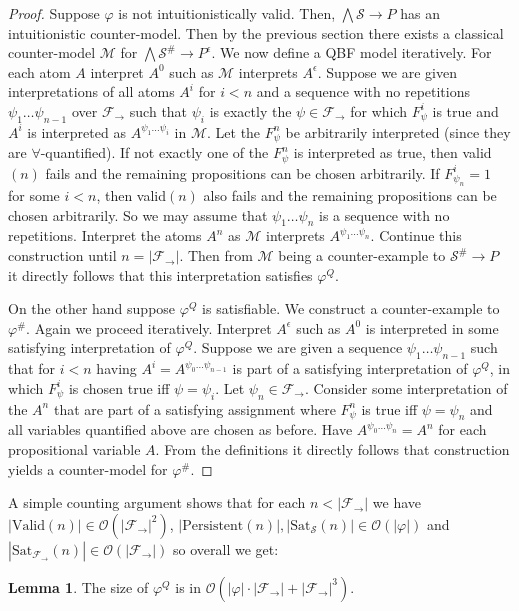 \documentclass[a4paper,11pt]{report}
\theoremstyle{definition}
\theoremstyle{definition}
\theoremstyle{definition}
\newtheorem{lemma}[theorem]{Lemma}
\theoremstyle{definition}
\theoremstyle{definition}
\theoremstyle{definition}
\theoremstyle{definition}
\begin{document}
	\begin{proof}
		Suppose $\varphi$ is not intuitionistically valid.
		Then, $\bigwedge\mathcal S\to P$ has an intuitionistic counter-model. Then by the previous section there exists a classical counter-model $\mathcal M$ for $\bigwedge\mathcal S^\#\to P^\epsilon$.
		We now define a QBF model iteratively.
		For each atom $A$ interpret $A^0$ such as $\mathcal M$ interprets $A^\epsilon$. Suppose we are given interpretations of all atoms $A^i$ for $i < n$ and a sequence with no repetitions $\psi_1\dots\psi_{n-1}$ over $\mathcal F_\to$ such that $\psi_i$ is exactly the $\psi\in\mathcal F_\to$ for which $F_{\psi}^i$ is true and $A^i$ is interpreted as $A^{\psi_1\dots\psi_i}$  in $\mathcal M$.
		Let the $F^{n}_\psi$ be arbitrarily interpreted (since they are $\forall$-quantified). If not exactly one of the $F^{n}_\psi$ is interpreted as true, then valid$(n)$ fails and the remaining propositions can be chosen arbitrarily. If $F^i_{\psi_n} = 1$ for some $i < n$, then valid$(n)$ also fails and the remaining propositions can be chosen arbitrarily.
		So we may assume that $\psi_1\dots\psi_n$ is a sequence with no repetitions.
		Interpret the atoms $A^n$ as $\mathcal M$ interprets $A^{\psi_1\dots\psi_n}$.
		Continue this construction until $n  = |\mathcal F_\to|$. Then from $\mathcal M$ being a counter-example to $\mathcal S^\#\to P$ it directly follows that this interpretation satisfies $\varphi^Q$.
		
		On the other hand suppose $\varphi^Q$ is satisfiable. We construct a counter-example to $\varphi^\#$.
		Again we proceed iteratively. Interpret $A^\epsilon$ such as $A^0$ is interpreted in some satisfying interpretation of $\varphi^Q$. Suppose we are given a sequence $\psi_1\dots \psi_{n-1}$ such that for $i<n$ having $A^i = A^{\psi_0\dots\psi_{n-1}}$ is part of a satisfying interpretation of $\varphi^Q$, in which $F^i_\psi$ is chosen true iff $\psi = \psi_i$. Let $\psi_n\in\mathcal F_\to$. Consider some interpretation of the $A^n$ that are part of a satisfying assignment where $F^n_\psi$ is true iff $\psi = \psi_n$ and all variables quantified above are chosen as before. Have $A^{\psi_0\dots\psi_n} = A^n$ for each propositional variable $A$. From the definitions it directly follows that construction yields a counter-model for $\varphi^\#$.
	\end{proof}
	
	A simple counting argument shows that for each $n < |\mathcal F_\to|$ we have $|\text{Valid}(n)|\in \mathcal O(|\mathcal F_\to|^2)$, $|\text{Persistent}(n)|, |\text{Sat}_{\mathcal S}(n)|\in \mathcal O(|\varphi|)$ and $|\text{Sat}_{\mathcal F_\to}(n)|\in \mathcal O(|\mathcal F_\to|)$ so overall we get:
	\begin{lemma}
		The size of $\varphi^Q$ is in $\mathcal O(|\varphi|\cdot|\mathcal F_\to| + |\mathcal F_\to|^3)$.
	\end{lemma}
	
\end{document}
